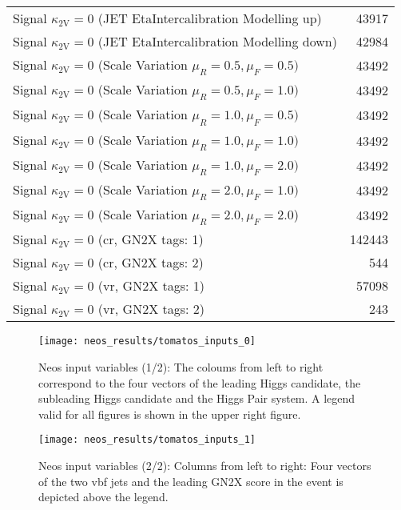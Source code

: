 \begin{table}[]
\begin{tabular}{lr}
        Signal $\kappa_\mathrm{2V}=0$ (JET EtaIntercalibration Modelling up)           & 43917  \\
        Signal $\kappa_\mathrm{2V}=0$ (JET EtaIntercalibration Modelling down)         & 42984  \\
        Signal $\kappa_\mathrm{2V}=0$ (Scale Variation $\mu_R = 0.5, \mu_F=0.5)$       & 43492  \\
        Signal $\kappa_\mathrm{2V}=0$ (Scale Variation $\mu_R = 0.5, \mu_F=1.0)$       & 43492  \\
        Signal $\kappa_\mathrm{2V}=0$ (Scale Variation $\mu_R = 1.0, \mu_F=0.5)$       & 43492  \\
        Signal $\kappa_\mathrm{2V}=0$ (Scale Variation $\mu_R = 1.0, \mu_F=1.0)$       & 43492  \\
        Signal $\kappa_\mathrm{2V}=0$ (Scale Variation $\mu_R = 1.0, \mu_F=2.0)$       & 43492  \\
        Signal $\kappa_\mathrm{2V}=0$ (Scale Variation $\mu_R = 2.0, \mu_F=1.0)$       & 43492  \\
        Signal $\kappa_\mathrm{2V}=0$ (Scale Variation $\mu_R = 2.0, \mu_F=2.0$)       & 43492  \\ \hline
        Signal $\kappa_\mathrm{2V}=0$ (\ac{cr}, GN2X tags: 1)                          & 142443 \\
        Signal $\kappa_\mathrm{2V}=0$ (\ac{cr}, GN2X tags: 2)                          & 544    \\
        Signal $\kappa_\mathrm{2V}=0$ (\ac{vr}, GN2X tags: 1)                          & 57098  \\
        Signal $\kappa_\mathrm{2V}=0$ (\ac{vr}, GN2X tags: 2)                          & 243    \\
    \end{tabular}
    \label{tab:neos-samples}
\end{table}


\begin{figure}
    \centering
    \texttt{[image: neos\_results/tomatos\_inputs\_0]}
    \caption[]{Neos input variables (1/2): The coloums from left to right correspond to the four vectors of the leading Higgs candidate, the subleading Higgs candidate and the Higgs Pair system. A legend valid for all figures is shown in the upper right figure.}
    \label{fig:tomatos_inputs_0}
\end{figure}



\begin{figure}
    \centering
    \texttt{[image: neos\_results/tomatos\_inputs\_1]}
    \caption[]{Neos input variables (2/2): Columns from left to right: Four vectors of the two vbf jets and the leading GN2X score in the event is depicted above the legend.}
    \label{fig:tomatos_inputs_1}
\end{figure}
